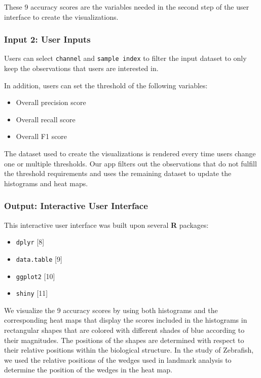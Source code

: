 \documentclass[10pt,letterpaper]{article}
\providecommand{\tightlist}{%
  \setlength{\itemsep}{0pt}\setlength{\parskip}{0pt}}
\begin{document}
These 9 accuracy scores are the variables needed in the second step of
the user interface to create the visualizations.

\subsubsection{Input 2: User Inputs}\label{input-2-user-inputs}

Users can select \texttt{channel} and \texttt{sample\ index} to filter
the input dataset to only keep the observations that users are
interested in.

In addition, users can set the threshold of the following variables:

\begin{itemize}
\tightlist
\item
  Overall precision score
\item
  Overall recall score
\item
  Overall F1 score
\end{itemize}

The dataset used to create the visualizations is rendered every time
users change one or multiple thresholds. Our app filters out the
observations that do not fulfill the threshold requirements and uses the
remaining dataset to update the histograms and heat maps.

\subsubsection{Output: Interactive User
Interface}\label{output-interactive-user-interface}

This interactive user interface was built upon several \textbf{R}
packages:

\begin{itemize}
\tightlist
\item
  \texttt{dplyr} {[}8{]}
\item
  \texttt{data.table} {[}9{]}
\item
  \texttt{ggplot2} {[}10{]}
\item
  \texttt{shiny} {[}11{]}
\end{itemize}

We visualize the 9 accuracy scores by using both histograms and the
corresponding heat maps that display the scores included in the
histograms in rectangular shapes that are colored with different shades
of blue according to their magnitudes. The positions of the shapes are
determined with respect to their relative positions within the
biological structure. In the study of Zebrafish, we used the relative
positions of the wedges used in landmark analysis to determine the
position of the wedges in the heat map.
\end{document}
